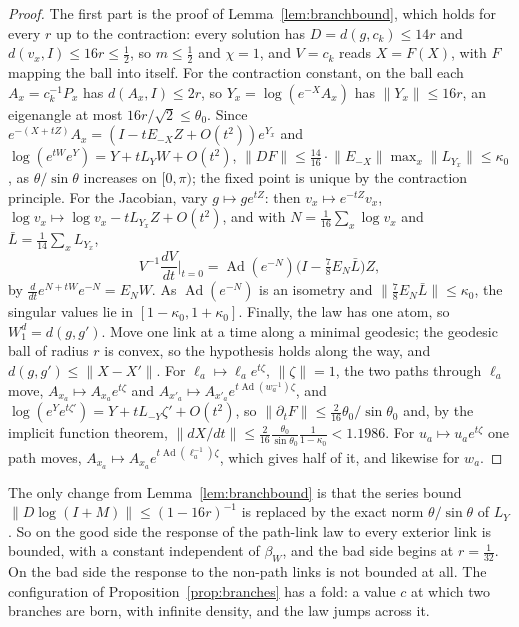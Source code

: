 \documentclass[11pt]{amsart}
\theoremstyle{definition}
\theoremstyle{remark}
\numberwithin{equation}{section}
\begin{document}
\begin{proof}
The first part is the proof of Lemma~\ref{lem:branchbound}, which holds for
every $r$ up to the contraction: every solution has $D=d(g,c_k)\le14r$ and
$d(v_x,I)\le16r\le\frac12$, so $m\le\frac12$ and $\chi=1$, and $V=c_k$ reads
$X=F(X)$, with $F$ mapping the ball into itself. For the contraction
constant, on the ball each $A_x=c_k^{-1}P_x$ has $d(A_x,I)\le2r$, so $Y_x=
\log(e^{-X}A_x)$ has $\lVert Y_x\rVert\le16r$, an eigenangle at most
$16r/\sqrt2\le\theta_0$. Since $e^{-(X+tZ)}A_x=(I-tE_{-X}Z+O(t^2))e^{Y_x}$
and $\log(e^{tW}e^Y)=Y+tL_YW+O(t^2)$, $\lVert DF\rVert\le\frac{14}{16}\cdot
\lVert E_{-X}\rVert\max_x\lVert L_{Y_x}\rVert\le\kappa_0$, as $\theta/\sin
\theta$ increases on $[0,\pi)$; the fixed point is unique by the
contraction principle. For the Jacobian, vary $g\mapsto ge^{tZ}$: then
$v_x\mapsto e^{-tZ}v_x$, $\log v_x\mapsto\log v_x-tL_{Y_x}Z+O(t^2)$, and
with $N=\frac1{16}\sum_x\log v_x$ and $\bar L=\frac1{14}\sum_xL_{Y_x}$,
\[
V^{-1}\frac{dV}{dt}\Big|_{t=0}=\operatorname{Ad}(e^{-N})\bigl(I-\tfrac78
E_N\bar L\bigr)Z ,
\]
by $\frac d{dt}e^{N+tW}e^{-N}=E_NW$. As $\operatorname{Ad}(e^{-N})$ is an
isometry and $\lVert\frac78E_N\bar L\rVert\le\kappa_0$, the singular values
lie in $[1-\kappa_0,1+\kappa_0]$. Finally, the law has one atom, so $W_1^d=
d(g,g')$. Move one link at a time along a minimal geodesic; the geodesic
ball of radius $r$ is convex, so the hypothesis holds along the way, and
$d(g,g')\le\lVert X-X'\rVert$. For $\ell_a\mapsto\ell_ae^{t\zeta}$,
$\lVert\zeta\rVert=1$, the two paths through $\ell_a$ move, $A_{x_a}\mapsto
A_{x_a}e^{t\zeta}$ and $A_{x'_a}\mapsto A_{x'_a}e^{t\operatorname{Ad}(w_a^{-1}
)\zeta}$, and $\log(e^Ye^{t\zeta'})=Y+tL_{-Y}\zeta'+O(t^2)$, so
$\lVert\partial_tF\rVert\le\frac2{16}\theta_0/\sin\theta_0$ and, by the
implicit function theorem, $\lVert dX/dt\rVert\le\frac2{16}\frac{\theta_0}
{\sin\theta_0}\frac1{1-\kappa_0}<1.1986$. For $u_a\mapsto u_ae^{t\zeta}$
one path moves, $A_{x_a}\mapsto A_{x_a}e^{t\operatorname{Ad}(\ell_a^{-1})
\zeta}$, which gives half of it, and likewise for $w_a$.
\end{proof}

The only change from Lemma~\ref{lem:branchbound} is that the series bound
$\lVert D\log(I+M)\rVert\le(1-16r)^{-1}$ is replaced by the exact norm
$\theta/\sin\theta$ of $L_Y$. So on the good side the response of the
path-link law to every exterior link is bounded, with a constant
independent of $\beta_W$, and the bad side begins at $r=\frac1{32}$. On
the bad side the response to the non-path links is not bounded at all.
The configuration of Proposition~\ref{prop:branches} has a fold: a value
$c$ at which two branches are born, with infinite density, and the law
jumps across it.
\end{document}
